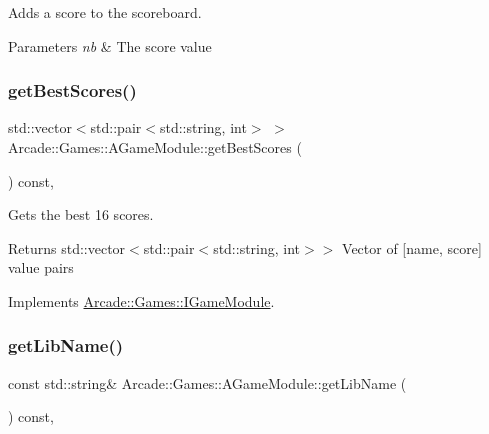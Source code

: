 Adds a score to the scoreboard. 


\begin{DoxyParams}{Parameters}
{\em nb} & The score value \\
\hline
\end{DoxyParams}
\mbox{\label{classArcade_1_1Games_1_1AGameModule_aaebba3bd5236f97cb18867fe99c7135b}} 
\subsubsection{\texorpdfstring{getBestScores()}{getBestScores()}}
{\footnotesize\ttfamily std\+::vector$<$std\+::pair$<$std\+::string, int$>$ $>$ Arcade\+::\+Games\+::\+A\+Game\+Module\+::get\+Best\+Scores (\begin{DoxyParamCaption}{ }\end{DoxyParamCaption}) const\hspace{0.3cm}{\ttfamily [final]}, {\ttfamily [virtual]}}



Gets the best 16 scores. 

\begin{DoxyReturn}{Returns}
std\+::vector$<$std\+::pair$<$std\+::string, int$>$$>$ Vector of \mbox{[}name, score\mbox{]} value pairs 
\end{DoxyReturn}


Implements \mbox{\hyperlink{classArcade_1_1Games_1_1IGameModule_afaec4931b0051ba589fbe1b14d20131b}{Arcade\+::\+Games\+::\+I\+Game\+Module}}.

\mbox{\label{classArcade_1_1Games_1_1AGameModule_a3245a3ba2eac74eadf5041bc3806ed6b}} 
\subsubsection{\texorpdfstring{getLibName()}{getLibName()}}
{\footnotesize\ttfamily const std\+::string\& Arcade\+::\+Games\+::\+A\+Game\+Module\+::get\+Lib\+Name (\begin{DoxyParamCaption}{ }\end{DoxyParamCaption}) const\hspace{0.3cm}{\ttfamily [final]}, {\ttfamily [virtual]}}




